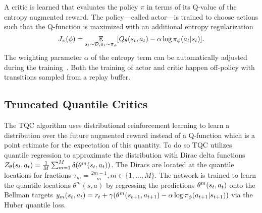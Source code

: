 A critic is learned that evaluates the policy $\pi$ in terms of its Q-value of the entropy augmented reward.
The policy---called actor---is trained to choose actions such that the Q-function is maximized with an additional entropy regularization
\vspace{-0.1cm}
\begin{equation}
    J_\pi (\phi) = \E_{\stt \sim \cD, \at \sim \pi_\phi} 
                    [ Q_\theta(\stt, \at) - \alpha \log \pi_\phi (\at|\stt) ].
\vspace{-0.1cm}
\end{equation}
The weighting parameter $\alpha$ of the entropy term can be automatically adjusted during the training~\cite{SACalgapp}.
Both the training of actor and critic happen off-policy with transitions sampled from a replay buffer.



\subsection{Truncated Quantile Critics}

The TQC algorithm uses distributional reinforcement learning \cite{bellemare2017distributional} to learn
a distribution over the future augmented reward instead of a Q-function which is a point estimate for the expectation of this quantity.
To do so TQC utilizes quantile regression \cite{dabney2018distributional} to approximate the distribution with Dirac delta functions
$Z_\theta (s_t,a_t) = \frac{1}{M} \sum_{m=1}^{M} \delta ( \theta^m (s_t,a_t))$.
The Diracs are located at the quantile locations for fractions 
$\tau_m = \frac{2m -1}{m}, m \in \{1, \dots, M \}$. The network is trained to learn the quantile locations $\theta^m (s,a)$  
by regressing the predictions $\theta^m (s_t, a_t)$ onto the Bellman targets 
$y_m(s_t, a_t) = r_t + \gamma ( \theta^m (s_{t+1}, a_{t+1}) - \alpha \log \pi_\phi (a_{t+1} | s_{t+1} ))$ 
via the  Huber quantile loss.



